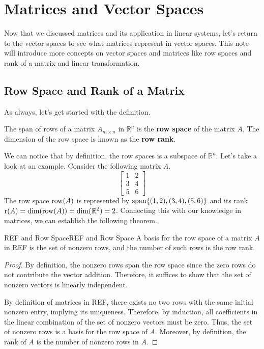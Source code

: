 \documentclass[../main.tex]{subfiles}
\begin{document}
\chapter{Matrices and Vector Spaces}

Now that we discussed matrices and its application in linear systems,
let's return to the vector spaces to see what matrices represent in
vector spaces. This note will introduce more concepts on vector spaces
and matrices like row spaces and rank of a matrix and linear
transformation.

\section{Row Space and Rank of a Matrix}

As always, let's get started with the definition.

\begin{definition}
The span of rows of a matrix $A_{m \times n}$ in $\mathbb{R}^n$ is the
\textbf{row space} of the matrix $A$. The dimension of the row space
is known as the \textbf{row rank}.
\end{definition}

We can notice that by definition, the row spaces is a subspace of
$\mathbb{R}^n$. Let's take a look at an example. Consider the
following matrix $A$.
\[
\begin{bmatrix}
    1 & 2 \\
    3 & 4 \\
    5 & 6
\end{bmatrix}
\]
The row space $\operatorname{row}(A)$ is represented by $\operatorname{span}\{ (1, 2), (3, 4),
(5, 6) \}$ and its rank $\operatorname{r}(A) = \dim(\operatorname{row}(A)) = \dim(\mathbb{R}^2)
= 2$. Connecting this with our knowledge in matrices, we can establish
the following theorem.

\begin{theorem}{REF and Row Space}{REF and Row Space}
A basis for the row space of a matrix $A$ in REF is the set of nonzero
rows, and the number of such rows is the row rank.
\end{theorem}
\begin{proof}
By definition, the nonzero rows span the row space since the zero rows
do not contribute the vector addition. Therefore, it suffices to show
that the set of nonzero vectors is linearly independent.

By definition of matrices in REF, there exists no two rows with the
same initial nonzero entry, implying its uniqueness. Therefore, by
induction, all coefficients in the linear combination of the set of
nonzero vectors must be zero. Thus, the set of nonzero rows is a basis
for the row space of $A$. Moreover, by definition, the rank of $A$
is the number of nonzero rows in $A$.
\end{proof}
\end{document}

